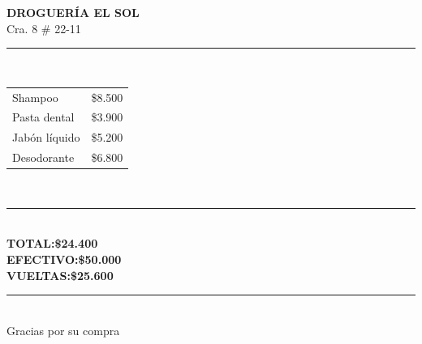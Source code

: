 \documentclass[11pt]{article}
\begin{document}
\noindent
\begin{minipage}[t]{0.42\linewidth}
	\vspace{0pt} %
	\begin{tcolorbox}[enhanced, colback=white, colframe=valdark, arc=2mm, boxrule=1.5pt, drop shadow={opacity=0.15,shadow xshift=2pt,shadow yshift=-2pt}]
		\begin{center}
			{\large\bfseries DROGUERÍA EL SOL}\\[2pt]
			{\small Cra. 8 \# 22-11}\\[4pt]
			\rule{5.5cm}{0.6pt}\\[4pt]
			\renewcommand{\arraystretch}{1.4}
			\begin{tabular}{lr}
				Shampoo         & \$8.500 \\
				Pasta dental    & \$3.900 \\
				Jabón líquido   & \$5.200 \\
				Desodorante     & \$6.800 \\
			\end{tabular}\\[4pt]
			\rule{5.5cm}{0.6pt}\\[4pt]
			\textcolor{valred}{\bfseries TOTAL:\hfill\$24.400}\\[3pt]
			\textcolor{valgreen}{\bfseries EFECTIVO:\hfill\$50.000}\\[3pt]
			\textcolor{valorange}{\bfseries VUELTAS:\hfill\$25.600}\\[4pt]
			\rule{5.5cm}{0.6pt}\\[3pt]
			{\small Gracias por su compra}
		\end{center}
	\end{tcolorbox}
\end{minipage}\hfill
\end{document}
